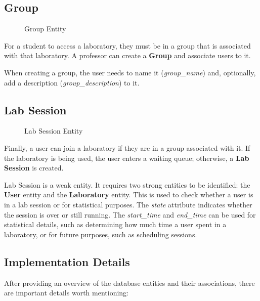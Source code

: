 \subsection*{Group}

\begin{figure}[H]
    \centering
    
    \caption{Group Entity}
    \label{fig:group_entity}
\end{figure}

For a student to access a laboratory, they must be in a group that is associated with that laboratory. A professor can create a \textbf{Group} and associate users to it.

When creating a group, the user needs to name it (\textit{group\_name}) and, optionally, add a description (\textit{group\_description}) to it.

\subsection*{Lab Session}

\begin{figure}[H]
    \centering
    
    \caption{Lab Session Entity}
    \label{fig:lab_session_entity}
\end{figure}

Finally, a user can join a laboratory if they are in a group associated with it. If the laboratory is being used, the user enters a waiting queue; otherwise, a \textbf{Lab Session} is created.

Lab Session is a weak entity. It requires two strong entities to be identified: the \textbf{User} entity and the \textbf{Laboratory} entity. This is used to check whether a user is in a lab session or for statistical purposes. The \textit{state} attribute indicates whether the session is over or still running. The \textit{start\_time} and \textit{end\_time} can be used for statistical details, such as determining how much time a user spent in a laboratory, or for future purposes, such as scheduling sessions.

\subsection{Implementation Details}
After providing an overview of the database entities and their associations, there are important details worth mentioning:


